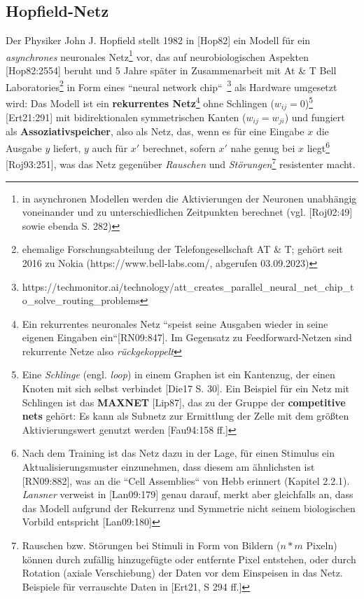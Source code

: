 \subsection{Hopfield-Netz}

Der Physiker John J. Hopfield stellt 1982 in [Hop82] ein Modell für ein \textit{asynchrones} neuronales Netz\footnote{
    in asynchronen Modellen werden die Aktivierungen der Neuronen unabhängig voneinander und zu unterschiedlichen Zeitpunkten berechnet (vgl. [Roj02:49] sowie ebenda S. 282)
}  vor, das auf neurobiologischen Aspekten [Hop82:2554] beruht und 5 Jahre später in Zusammenarbeit mit At & T Bell Laboratories\footnote{
    ehemalige Forschungsabteilung der Telefongesellschaft AT \& T;  gehört seit 2016 zu Nokia (https://www.bell-labs.com/, abgerufen 03.09.2023)
} in Form eines ``neural network chip``~\cite[457]{AR88}\footnote{
    https://techmonitor.ai/technology/att\_creates\_parallel\_neural\_net\_chip\_to\_solve\_routing\_problems
} als Hardware umgesetzt wird: Das Modell ist ein \textbf{rekurrentes Netz}\footnote{
Ein rekurrentes neuronales Netz ``speist seine Ausgaben wieder in seine eigenen Eingaben ein``[RN09:847]. Im Gegensatz zu Feedforward-Netzen sind rekurrente Netze also \textit{rückgekoppelt}
} ohne Schlingen ($w_{ij} = 0$)\footnote{ Eine \textit{Schlinge} (engl. \textit{loop}) in einem Graphen ist ein Kantenzug, der einen Knoten mit sich selbst verbindet [Die17 S. 30]. Ein Beispiel für ein Netz mit Schlingen ist das \textbf{MAXNET} [Lip87], das zu der Gruppe der \textbf{competitive nets} gehört: Es kann als Subnetz zur Ermittlung der Zelle mit dem größten Aktivierungswert genutzt werden [Fau94:158 ff.]
} [Ert21:291] mit bidirektionalen symmetrischen Kanten ($w_{ij} = w_{ji}$) und fungiert als \textbf{Assoziativspeicher}, also als Netz, das, wenn es für eine Eingabe $x$ die Ausgabe $y$ liefert, $y$ auch für $x'$ berechnet, sofern $x'$ nahe genug bei $x$ liegt\footnote{ Nach dem Training ist das Netz dazu in der Lage, für einen Stimulus ein Aktualisierungsmuster einzunehmen, dass diesem am ähnlichsten ist [RN09:882], was an die ``Cell Assemblies`` von Hebb erinnert (Kapitel 2.2.1). \textit{Lansner} verweist in [Lan09:179] genau darauf, merkt aber gleichfalls an, dass das Modell aufgrund der Rekurrenz und Symmetrie nicht seinem biologischen Vorbild entspricht [Lan09:180]
} [Roj93:251], was das Netz gegenüber \textit{Rauschen} und \textit{Störungen}\footnote{
    Rauschen bzw. Störungen bei Stimuli in Form von Bildern ($n * m$ Pixeln) können durch zufällig hinzugefügte oder entfernte Pixel entstehen, oder durch Rotation (axiale Verschiebung) der Daten vor dem Einspeisen in das Netz. Beispiele für verrauschte Daten in [Ert21, S 294 ff.]
} resistenter macht.

